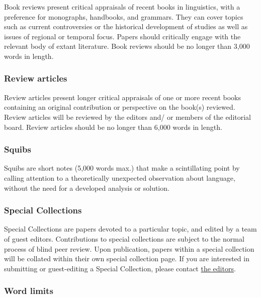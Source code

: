 \documentclass[cm,linguex]{glossa}
\begin{document}
Book reviews present critical appraisals of recent books in linguistics,
with a preference for monographs, handbooks, and grammars. They can
cover topics such as current controversies or the historical development
of studies as well as issues of regional or temporal focus. Papers
should critically engage with the relevant body of extant literature.
Book reviews should be no longer than 3,000 words in length.

\hypertarget{review-articles}{%
\subsubsection{Review articles}\label{review-articles}}

Review articles present longer critical appraisals of one or more recent
books containing an original contribution or perspective on the book(s)
reviewed. Review articles will be reviewed by the editors and/ or
members of the editorial board. Review articles should be no longer than
6,000 words in length.

\hypertarget{squibs}{%
\subsubsection{Squibs}\label{squibs}}

Squibs are short notes (5,000 words max.) that make a scintillating
point by calling attention to a theoretically unexpected observation
about language, without the need for a developed analysis or solution.

\hypertarget{special-collections}{%
\subsubsection{Special Collections}\label{special-collections}}

Special Collections are papers devoted to a particular topic, and edited
by a team of guest editors. Contributions to special collections are
subject to the normal process of blind peer review. Upon publication,
papers within a special collection will be collated within their own
special collection page. If you are interested in submitting or
guest-editing a Special Collection, please contact
\href{https://www.glossa-journal.org/about/editorialteam/}{the editors}.

\hypertarget{word-limits}{%
\subsubsection{Word limits}\label{word-limits}}
\end{document}
